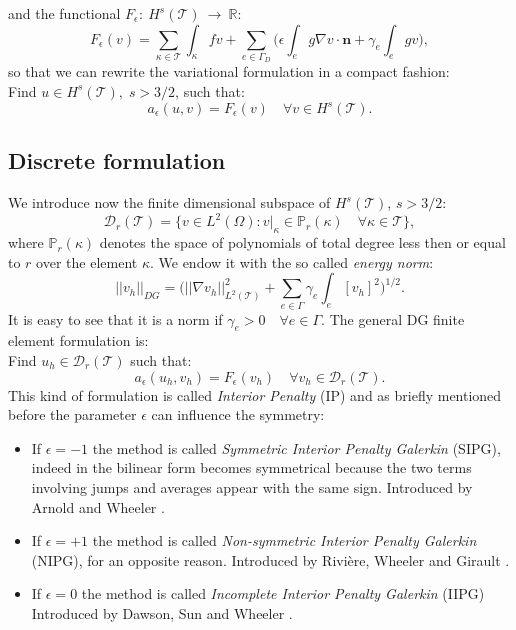\documentclass[12pt, a4paper]{article}
\theoremstyle{definition}
\theoremstyle{plain}
\theoremstyle{plain}
\theoremstyle{definition}
\begin{document}
and the functional $F_\epsilon:~H^s(\mathcal{T})~\rightarrow~\mathbb{R}$:
\begin{equation*}
	F_\epsilon(v) = \sum_{\kappa \in \mathcal{T}} \int_\kappa fv
	+ \sum_{e \in \Gamma_D} \bigg( \epsilon \int_e g \nabla v \cdot \mathbf{n}
	+ \gamma_e \int_e gv \bigg),
\end{equation*}
so that we can rewrite the variational formulation in a compact fashion:\\
Find $u \in H^s(\mathcal{T}), \; s>3/2$, such that:
\begin{equation} \label{eq:dgvarform}
	a_\epsilon(u, v) = F_\epsilon(v) \quad \forall v \in H^s(\mathcal{T}).
\end{equation}
\subsection{Discrete formulation}
We introduce now the finite dimensional subspace of $H^s(\mathcal{T})$, $s>3/2$:
\begin{equation} \label{eq:dgspace}
	\mathcal{D}_r(\mathcal{T}) = \{ v \in L^2(\Omega) : v|_\kappa \in 
	\mathbb{P}_r(\kappa) \quad \forall \kappa \in \mathcal{T}  \},
\end{equation}
where $\mathbb{P}_r(\kappa)$ denotes the space of polynomials of total degree 
less then or equal to $r$ over the element $\kappa$. We endow it with the so 
called \textit{energy norm}:
\begin{equation*}
	|\!|v_h|\!|_{DG} = \bigg( |\!|\nabla v_h|\!|^2_{L^2(\mathcal{T})} + \sum_{e \in \Gamma} \gamma_e \int_e [v_h]^2 \bigg)^{1/2}.
\end{equation*}
It is easy to see that it is a norm if $\gamma_e > 0 \quad \forall e \in 
\Gamma$. The general DG finite element formulation is:\\
Find $u_h \in \mathcal{D}_r(\mathcal{T})$ such that:
\begin{equation} \label{eq:dgfemform}
	a_\epsilon(u_h, v_h) = F_\epsilon(v_h) \quad \forall v_h \in 
	\mathcal{D}_r(\mathcal{T}).
\end{equation}
This kind of formulation is called \textit{Interior Penalty} (IP) and as briefly mentioned before the parameter $\epsilon$ can influence the symmetry:
\begin{itemize}
\item
If $\epsilon = -1$ the method is called \textit{Symmetric Interior Penalty 
Galerkin} (SIPG), indeed in the bilinear form becomes symmetrical because the 
two terms involving jumps and averages appear with the same sign. Introduced by 
Arnold \cite{arn82} and Wheeler \cite{whe78}.
\item
If  $\epsilon = +1$ the method is called \textit{Non-symmetric Interior Penalty 
Galerkin} (NIPG), for an opposite reason. Introduced by Rivière, Wheeler 
and Girault \cite{rwg}.
\item
If $\epsilon = 0$ the method is called \textit{Incomplete Interior Penalty 
Galerkin} (IIPG) Introduced by Dawson, Sun and Wheeler \cite{dsw}.
\end{itemize}
\end{document}
